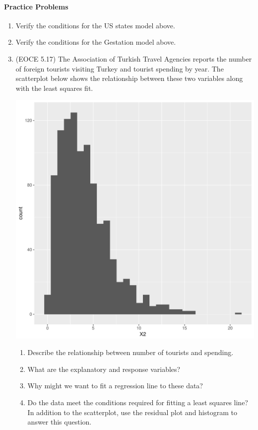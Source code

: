 \documentclass[10pt]{article}\usepackage[]{graphicx}\usepackage[]{color}
\makeatletter
\def\maxwidth{ %
  \ifdim\Gin@nat@width>\linewidth
    \linewidth
  \else
    \Gin@nat@width
  \fi
}
\newenvironment{knitrout}{}{} %
\makeatother
\begin{document}
\clearpage
\paragraph{Practice Problems}
\begin{enumerate}
  \item Verify the conditions for the US states model above.
  \item Verify the conditions for the Gestation model above. 
  \item (EOCE 5.17) The Association of Turkish Travel Agencies reports the number of foreign tourists visiting Turkey and tourist spending by year. The scatterplot below shows the relationship between these two variables along with the least squares fit.
  
\begin{knitrout}
\color{fgcolor}
\includegraphics[width=\maxwidth]{figure/unnamed-chunk-5-1} 

\end{knitrout}

  \begin{enumerate}
    \itemsep0.5in
    \item Describe the relationship between number of tourists and spending.
    \item What are the explanatory and response variables?
    \item Why might we want to fit a regression line to these data?
    \item Do the data meet the conditions required for fitting a least squares line? In addition to the scatterplot, use the residual plot and histogram to answer this question.
  \end{enumerate}

\end{enumerate}
\end{document}
